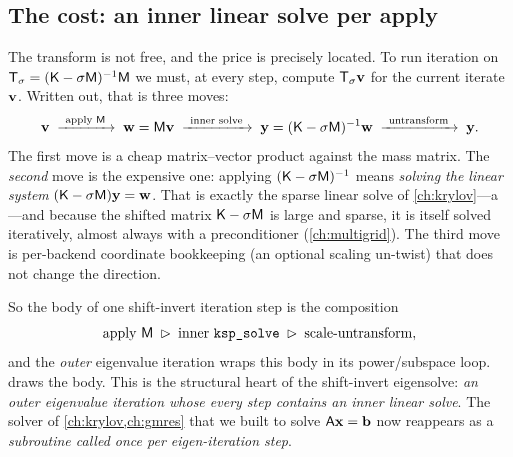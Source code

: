 \subsection{The cost: an inner linear solve per apply}

The transform is not free, and the price is precisely located. To run iteration
on $\mathsf{T}_\sigma=(\mathsf{K}-\sigma\mathsf{M})^{-1}\mathsf{M}$ we must, at every step, compute
$\mathsf{T}_\sigma\mathbf{v}$ for the current iterate $\mathbf{v}$. Written out, that is three
moves:
\begin{equation}
  \mathbf{v}
  \;\xrightarrow{\ \text{apply }\mathsf{M}\ }\;
  \mathbf{w} = \mathsf{M}\mathbf{v}
  \;\xrightarrow{\ \text{inner solve}\ }\;
  \mathbf{y} = (\mathsf{K}-\sigma\mathsf{M})^{-1}\mathbf{w}
  \;\xrightarrow{\ \text{untransform}\ }\;
  \mathbf{y} .
  \label{eq:siapply}
\end{equation}
The first move is a cheap matrix--vector product against the mass matrix. The
\emph{second} move is the expensive one: applying $(\mathsf{K}-\sigma\mathsf{M})^{-1}$ means
\emph{solving the linear system} $(\mathsf{K}-\sigma\mathsf{M})\mathbf{y}=\mathbf{w}$. That is exactly the
sparse linear solve of \cref{ch:krylov}---a ---and because the
shifted matrix $\mathsf{K}-\sigma\mathsf{M}$ is large and sparse, it is itself solved
iteratively, almost always with a preconditioner (\cref{ch:multigrid}). The third
move is per-backend coordinate bookkeeping (an optional scaling un-twist) that
does not change the direction.

So the body of one shift-invert iteration step is the composition
\begin{equation}
  \text{apply }\mathsf{M} \;\rhd\; \text{inner }\texttt{ksp\_solve} \;\rhd\;
  \text{scale-untransform},
\end{equation}
and the \emph{outer} eigenvalue iteration wraps this body in its power/subspace
loop.  draws the body. This is the structural heart of the
shift-invert eigensolve: \emph{an outer eigenvalue iteration whose every step
contains an inner linear solve}. The solver of \cref{ch:krylov,ch:gmres} that we
built to solve $\mathsf{A}\mathbf{x}=\mathbf{b}$ now reappears as a \emph{subroutine called once
per eigen-iteration step}.

